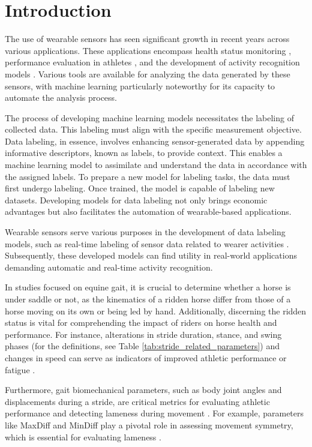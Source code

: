 \section{Introduction}
\label{sec:intro_introduction}

The use of wearable sensors has seen significant growth in recent years across various applications. These applications encompass health status monitoring \cite{jourdan_2021_the}, performance evaluation in athletes \cite{rana_2021_wearable}, and the development of activity recognition models \cite{ramanujam_2021_human}. Various tools are available for analyzing the data generated by these sensors, with machine learning particularly noteworthy for its capacity to automate the analysis process.

The process of developing machine learning models necessitates the labeling of collected data. This labeling must align with the specific measurement objective. Data labeling, in essence, involves enhancing sensor-generated data by appending informative descriptors, known as labels, to provide context. This enables a machine learning model to assimilate and understand the data in accordance with the assigned labels. To prepare a new model for labeling tasks, the data must first undergo labeling. Once trained, the model is capable of labeling new datasets. Developing models for data labeling not only brings economic advantages but also facilitates the automation of wearable-based applications.

Wearable sensors serve various purposes in the development of data labeling models, such as real-time labeling of sensor data related to wearer activities \cite{articllstm}. Subsequently, these developed models can find utility in real-world applications demanding automatic and real-time activity recognition.  

In studies focused on equine gait, it is crucial to determine whether a horse is under saddle or not, as the kinematics of a ridden horse differ from those of a horse moving on its own or being led by hand. Additionally, discerning the ridden status is vital for comprehending the impact of riders on horse health and performance. For instance, alterations in stride duration, stance, and swing phases (for the definitions, see Table \ref{tab:stride_related_parameters}) and changes in speed can serve as indicators of improved athletic performance or fatigue \cite{parkes_2019_the,Takahashi2021EffectsRaces}.

Furthermore, gait biomechanical parameters, such as body joint angles and displacements during a stride, are critical metrics for evaluating athletic performance and detecting lameness during movement \cite{Hardeman2019}. For example, parameters like MaxDiff and MinDiff play a pivotal role in assessing movement symmetry, which is essential for evaluating lameness \cite{Kramer2004}. 

